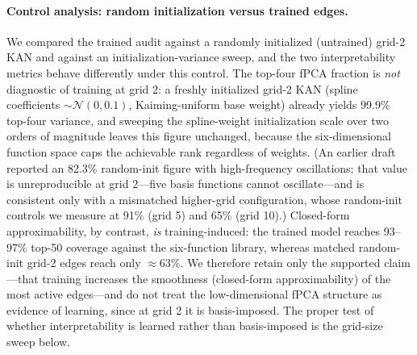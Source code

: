 \documentclass{article}
\begin{document}
\paragraph{Control analysis: random initialization versus trained edges.}
We compared the trained audit against a randomly initialized (untrained) grid-2 KAN and against an initialization-variance sweep, and the two interpretability metrics behave differently under this control. The top-four fPCA fraction is \emph{not} diagnostic of training at grid 2: a freshly initialized grid-2 KAN (spline coefficients \(\sim\mathcal{N}(0,0.1)\), Kaiming-uniform base weight) already yields 99.9\% top-four variance, and sweeping the spline-weight initialization scale over two orders of magnitude leaves this figure unchanged, because the six-dimensional function space caps the achievable rank regardless of weights. (An earlier draft reported an 82.3\% random-init figure with high-frequency oscillations; that value is unreproducible at grid 2---five basis functions cannot oscillate---and is consistent only with a mismatched higher-grid configuration, whose random-init controls we measure at 91\% (grid 5) and 65\% (grid 10).) Closed-form approximability, by contrast, \emph{is} training-induced: the trained model reaches 93--97\% top-50 coverage against the six-function library, whereas matched random-init grid-2 edges reach only \(\approx\)63\%. We therefore retain only the supported claim---that training increases the smoothness (closed-form approximability) of the most active edges---and do not treat the low-dimensional fPCA structure as evidence of learning, since at grid 2 it is basis-imposed. The proper test of whether interpretability is learned rather than basis-imposed is the grid-size sweep below.
\end{document}
